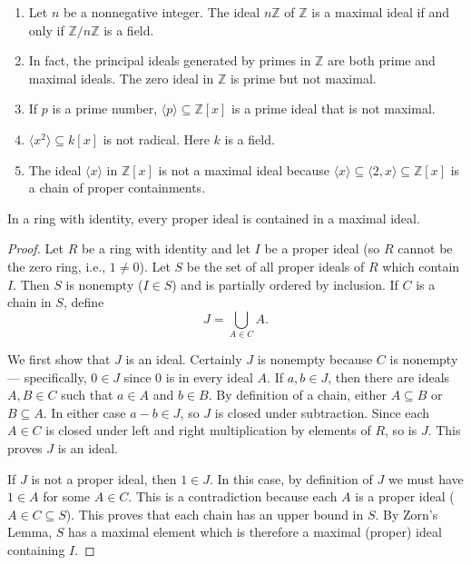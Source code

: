 \documentclass[11pt,a4paper]{article}
\begin{document}
\begin{exa}
\begin{enumerate}[label=(\roman*)]
\item Let $n$ be a nonnegative integer. The ideal $n \mathbb{Z}$ of $\mathbb{Z}$ is a maximal ideal if and only if $\mathbb{Z} / n \mathbb{Z}$ is a field. 

\item In fact, the principal ideals generated by primes in $\mathbb{Z}$ are both prime and maximal ideals. The zero ideal in $\mathbb{Z}$ is prime but not maximal.
\item If \(p\) is a prime number,  \(\langle p \rangle \subseteq \mathbb{Z}[x]\) is a prime ideal that is not  maximal.
\item  \(\langle x^2 \rangle \subseteq k[x]\) is not radical. Here \(k\) is a field.
\item The ideal $\langle x\rangle$ in $\mathbb{Z}[x]$ is not a maximal ideal because $\langle x\rangle \subseteq\langle 2, x\rangle \subseteq \mathbb{Z}[x]$ is a chain of proper containments.
\end{enumerate}
\end{exa}


\begin{prop}
    In a ring with identity, every proper ideal is contained in a maximal ideal.
\end{prop}
\begin{proof}
Let \( R \) be a ring with identity and let \( I \) be a proper ideal (so \( R \) cannot be the zero ring, i.e., \( 1 \neq 0 \)). Let \( S \) be the set of all proper ideals of \( R \) which contain \( I \). Then \( S \) is nonempty (\( I \in S \)) and is partially ordered by inclusion. If \( C \) is a chain in \( S \), define
\[
J = \bigcup_{A \in C} A.
\]

We first show that \( J \) is an ideal. Certainly \( J \) is nonempty because \( C \) is nonempty — specifically, \( 0 \in J \) since \( 0 \) is in every ideal \( A \). If \( a, b \in J \), then there are ideals \( A, B \in C \) such that \( a \in A \) and \( b \in B \). By definition of a chain, either \( A \subseteq B \) or \( B \subseteq A \). In either case \( a - b \in J \), so \( J \) is closed under subtraction. Since each \( A \in C \) is closed under left and right multiplication by elements of \( R \), so is \( J \). This proves \( J \) is an ideal.

If \( J \) is not a proper ideal, then \( 1 \in J \). In this case, by definition of \( J \) we must have \( 1 \in A \) for some \( A \in C \). This is a contradiction because each \( A \) is a proper ideal (\( A \in C \subseteq S \)). This proves that each chain has an upper bound in \( S \). By Zorn's Lemma, \( S \) has a maximal element which is therefore a maximal (proper) ideal containing \( I \).
\end{proof}
\end{document}
